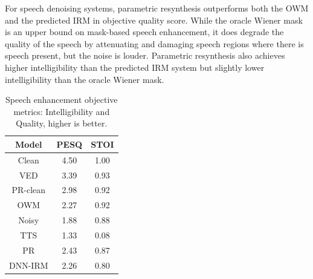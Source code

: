 \documentclass{article}
\begin{document}
For speech denoising systems, parametric resynthesis outperforms both the OWM and the predicted IRM in objective quality score.  While the oracle Wiener mask is an upper bound on mask-based speech enhancement, it does degrade the quality of the speech by attenuating and damaging speech regions where there is speech present, but the noise is louder. Parametric resynthesis also achieves higher intelligibility than the predicted IRM system but slightly lower intelligibility than the oracle Wiener mask. 

\begin{table}[bt]
    \centering
\begin{tabular}{ccc}
\toprule
Model & PESQ & STOI \\
\midrule
Clean               & 4.50 & 1.00 \\
VED  & 3.39 & 0.93 \\
PR-clean  & 2.98 & 0.92\\
OWM      & 2.27 & 0.92 \\
Noisy               & 1.88 & 0.88\\
TTS                 & 1.33 & 0.08\\
\midrule
PR &  2.43 & 0.87 \\
DNN-IRM          & 2.26 & 0.80\\
\bottomrule
\end{tabular}
\caption{Speech enhancement objective metrics: Intelligibility and Quality, higher is better.}
\label{tab:obj_denoise}
\end{table}
\end{document}
